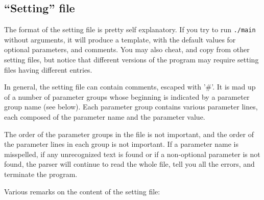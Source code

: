 \subsection{``Setting'' file}
The format of the setting file is pretty self explanatory. If you try
to run \verb|./main| without arguments, it will produce a template, with the 
default values for optional parameters, and comments. You may also cheat, and 
copy from other setting files, but notice that different versions of the program 
may require setting files having different entries.

In general, the setting file can contain comments, escaped with '\#'. It is mad 
up of a number of parameter groups whose beginning is indicated by a parameter 
group name (see below). Each parameter group contains various parameter lines, 
each composed of the parameter name and the parameter value.

The order of the parameter groups in the file is not important, and the order 
of the parameter lines in each group is not important. If a parameter name is 
misspelled, if any unrecognized text is found or if a non-optional parameter 
is not found, the parser will continue to read the whole file, tell you all 
the errors, and terminate the program.

Various remarks on the content of the setting file:

